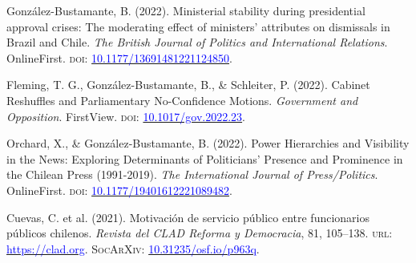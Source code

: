 \begin{publications}

\begin{benumerate}{9}

\item{González-Bustamante, B. (2022). Ministerial stability during presidential approval crises: The moderating effect of ministers’ attributes on dismissals in Brazil and Chile. {\itshape The British Journal of Politics and International Relations}. OnlineFirst. {\scshape doi:} \href{https://doi.org/10.1177/13691481221124850}{\textcolor{blue}{10.1177/13691481221124850}}.}\vspace{1mm}

\item{Fleming, T. G., González-Bustamante, B., \& Schleiter, P. (2022). Cabinet Reshuffles and Parliamentary No-Confidence Motions. {\itshape Government and Opposition}. FirstView. {\scshape doi:} \href{https://doi.org/10.1017/gov.2022.23}{\textcolor{blue}{10.1017/gov.2022.23}}.}\vspace{1mm}

\item{Orchard, X., \& González-Bustamante, B. (2022). Power Hierarchies and Visibility in the News: Exploring Determinants of Politicians’ Presence and Prominence in the Chilean Press (1991-2019). {\itshape The International Journal of Press/Politics}. OnlineFirst. {\scshape doi:} \href{https://doi.org/10.1177/19401612221089482}{\textcolor{blue}{10.1177/19401612221089482}}.}\vspace{1mm}


\item{\small Cuevas, C. et al. (2021). Motivación de servicio público entre funcionarios públicos chilenos. {\itshape Revista del CLAD Reforma y Democracia}, 81, 105--138. {\scshape url:} \href{https://clad.org/documentacion/revista-clad/articulos-publicados/081-noviembre-2021/}{\textcolor{blue}{https://clad.org}}. {\scshape \footnotesize SocArXiv:} \href{https://doi.org/10.31235/osf.io/p963q}{\textcolor{blue}{10.31235/osf.io/p963q}}.}\vspace{1mm}


\end{benumerate}
\end{publications}
